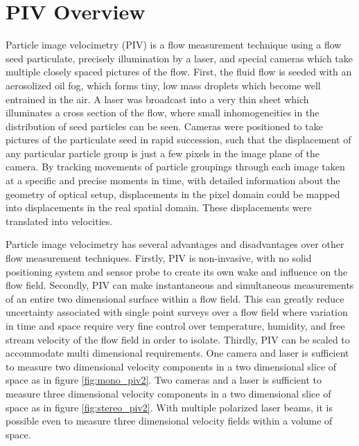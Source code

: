 \section{PIV Overview}

Particle image velocimetry (PIV) is a flow measurement technique using a flow 
seed particulate, precisely illumination by a laser, and special cameras which 
take multiple closely spaced pictures of the flow. First, the fluid flow is 
seeded with an aerosolized oil fog, which forms tiny, low mass droplets which 
become well entrained in the air. A laser was broadcast into a very thin sheet 
which illuminates a cross section of the flow, where small inhomogeneities in 
the distribution of seed particles can be seen. Cameras were positioned to take 
pictures of the particulate seed in rapid succession, such that the 
displacement of any particular particle group is just a few pixels in the image 
plane of the camera. By tracking movements of particle groupings through each 
image taken at a specific and precise moments in time, with detailed 
information about the geometry of optical setup, displacements in the pixel 
domain could be mapped into displacements in the real spatial domain. These 
displacements were translated into velocities.

Particle image velocimetry has several advantages and disadvantages over other 
flow measurement techniques. Firstly, PIV is non-invasive, with no solid 
positioning system and sensor probe to create its own wake and influence on the 
flow field. Secondly, PIV can make instantaneous and simultaneous measurements 
of an entire two dimensional surface within a flow field. This can greatly 
reduce uncertainty associated with single point surveys over a flow field where 
variation in time and space require very fine control over temperature, 
humidity, and free stream velocity of the flow field in order to isolate. 
Thirdly, PIV can be scaled to accommodate multi dimensional requirements. One 
camera and laser is sufficient to measure two dimensional velocity 
components in a two dimensional slice of space as in figure 
\ref{fig:mono_piv2}. 
Two cameras and a laser is sufficient to measure three dimensional velocity
components in a two dimensional slice of space as in figure
\ref{fig:stereo_piv2}. With multiple polarized laser beams, it is possible even
to measure three dimensional velocity fields within a volume of space. 


